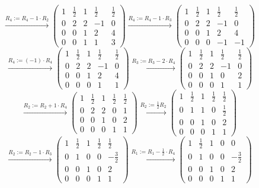 \documentclass[a4paper]{article}
\begin{document}
\[
\xrightarrow{\text{$R_4 := R_4 - 1 \cdot R_2$}}
\left(
\begin{array}{cccc|c}
1 & \frac{1}{2} & 1 & \frac{1}{2} & \frac{1}{2}  \\
0 & 2 & 2 & -1 & 0  \\
0 & 0 & 1 & 2 & 4  \\
0 & 0 & 1 & 1 & 3
\end{array}
\right)
\xrightarrow{\text{$R_4 := R_4 - 1 \cdot R_3$}}
\left(
\begin{array}{cccc|c}
1 & \frac{1}{2} & 1 & \frac{1}{2} & \frac{1}{2}  \\
0 & 2 & 2 & -1 & 0  \\
0 & 0 & 1 & 2 & 4  \\
0 & 0 & 0 & -1 & -1
\end{array}
\right)
\]
\[
\xrightarrow{\text{$R_4 := (-1) \cdot R_4$}}
\left(
\begin{array}{cccc|c}
1 & \frac{1}{2} & 1 & \frac{1}{2} & \frac{1}{2}  \\
0 & 2 & 2 & -1 & 0  \\
0 & 0 & 1 & 2 & 4  \\
0 & 0 & 0 & 1 & 1
\end{array}
\right)
\xrightarrow{\text{$R_3 := R_3 - 2 \cdot R_4$}}
\left(
\begin{array}{cccc|c}
1 & \frac{1}{2} & 1 & \frac{1}{2} & \frac{1}{2}  \\
0 & 2 & 2 & -1 & 0  \\
0 & 0 & 1 & 0 & 2  \\
0 & 0 & 0 & 1 & 1
\end{array}
\right)
\]
\[
\xrightarrow{\text{$R_2 := R_2 + 1 \cdot R_4$}}
\left(
\begin{array}{cccc|c}
1 & \frac{1}{2} & 1 & \frac{1}{2} & \frac{1}{2}  \\
0 & 2 & 2 & 0 & 1  \\
0 & 0 & 1 & 0 & 2  \\
0 & 0 & 0 & 1 & 1
\end{array}
\right)
\xrightarrow{\text{$R_2 := \frac{1}{2} R_2$}}
\left(
\begin{array}{cccc|c}
1 & \frac{1}{2} & 1 & \frac{1}{2} & \frac{1}{2}  \\
0 & 1 & 1 & 0 & \frac{1}{2}  \\
0 & 0 & 1 & 0 & 2  \\
0 & 0 & 0 & 1 & 1
\end{array}
\right)
\]
\[
\xrightarrow{\text{$R_2 := R_2 - 1 \cdot R_3$}}
\left(
\begin{array}{cccc|c}
1 & \frac{1}{2} & 1 & \frac{1}{2} & \frac{1}{2}  \\
0 & 1 & 0 & 0 & - \frac{3}{2}  \\
0 & 0 & 1 & 0 & 2  \\
0 & 0 & 0 & 1 & 1
\end{array}
\right)
\xrightarrow{\text{$R_1 := R_1 - \frac{1}{2} \cdot R_4$}}
\left(
\begin{array}{cccc|c}
1 & \frac{1}{2} & 1 & 0 & 0  \\
0 & 1 & 0 & 0 & - \frac{3}{2}  \\
0 & 0 & 1 & 0 & 2  \\
0 & 0 & 0 & 1 & 1
\end{array}
\right)
\]
\end{document}
